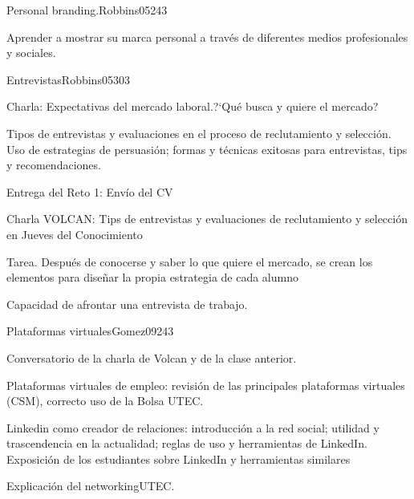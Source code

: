 \begin{syllabus}
\begin{unit}{Personal branding.}{}{Robbins05}{24}{3}
   \begin{learningoutcomes}
      \item Aprender a mostrar su marca personal a través de diferentes medios profesionales y sociales.
   \end{learningoutcomes}
\end{unit}

\begin{unit}{Entrevistas}{}{Robbins05}{30}{3}
   \begin{topics}
      \item Charla: Expectativas del mercado laboral.?`Qué busca y quiere el mercado?
      \item Tipos de entrevistas y evaluaciones en el proceso de reclutamiento y selección. Uso de estrategias de persuasión; formas y técnicas exitosas para entrevistas, tips y recomendaciones.
      \item Entrega del Reto 1: Envío del CV
      \item Charla VOLCAN: Tips de entrevistas y evaluaciones de reclutamiento y selección en Jueves del Conocimiento
      \item Tarea. Después de conocerse y saber lo que quiere el mercado, se crean los elementos para diseñar la propia estrategia de cada alumno
   \end{topics}

   \begin{learningoutcomes}
      \item Capacidad de afrontar una entrevista de trabajo.
   \end{learningoutcomes}
\end{unit}

\begin{unit}{Plataformas virtuales}{}{Gomez09}{24}{3}
   \begin{topics}
      \item Conversatorio de la charla de Volcan y de la clase anterior.
      \item Plataformas virtuales de empleo: revisión de las principales plataformas virtuales (CSM), correcto uso de la Bolsa UTEC.
      \item Linkedin como creador de relaciones: introducción a la red social; utilidad y trascendencia en la actualidad; reglas de uso y herramientas de LinkedIn. Exposición de los estudiantes sobre LinkedIn y herramientas similares
      \item Explicación del networkingUTEC.   
   \end{topics}


\end{unit}
\end{syllabus}
